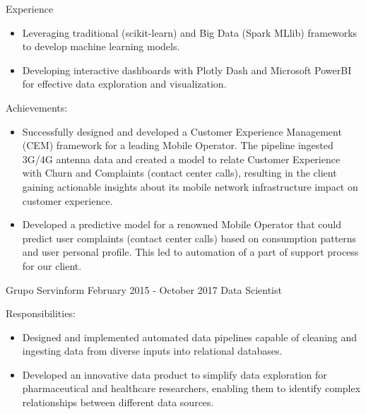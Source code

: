 \documentclass{cv}
\begin{document}
\begin{rSection}{Experience}
\begin{rSubsection}
\begin{itemize}
				\item Leveraging traditional (scikit-learn) and Big Data (Spark MLlib) frameworks to develop machine learning models.
				\item Developing interactive dashboards with Plotly Dash and Microsoft PowerBI for effective data exploration and visualization.
			
			\end{itemize}
			
			\vspace{2mm}
			
			\item Achievements:
			\begin{itemize}
				
				\item Successfully designed and developed a Customer Experience Management (CEM) framework for a leading Mobile Operator. The pipeline ingested 3G/4G antenna data and created a model to relate Customer Experience with Churn and Complaints (contact center calls), resulting in the client gaining actionable insights about its mobile network infrastructure impact on customer experience.
				\item Developed a predictive model for a renowned Mobile Operator that could predict user complaints (contact center calls) based on consumption patterns and user personal profile. This led to automation of a part of support process for our client.
				
			\end{itemize}
			
		\end{rSubsection}
			
				
		\begin{rSubsection}
			{Grupo Servinform}
			{February 2015 - October 2017}
			{Data Scientist}
			
			\item Responsibilities:
			\begin{itemize}
				
				\item Designed and implemented automated data pipelines capable of cleaning and ingesting data from diverse inputs into relational databases.
				\item Developed an innovative data product to simplify data exploration for pharmaceutical and healthcare researchers, enabling them to identify complex relationships between different data sources.
				

\end{itemize}
\end{rSubsection}
\end{rSection}
\end{document}
